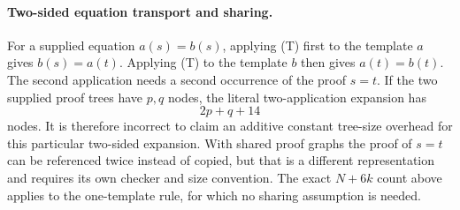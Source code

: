 \paragraph{Two-sided equation transport and sharing.}
For a supplied equation \(a(s)=b(s)\), applying (T) first to the template
\(a\) gives \(b(s)=a(t)\).  Applying (T) to the template \(b\) then gives
\(a(t)=b(t)\).  The second application needs a second occurrence of the
proof \(s=t\).  If the two supplied proof trees have \(p,q\) nodes, the
literal two-application expansion has
\[
                         2p+q+14
\]
nodes.  It is therefore incorrect to claim an additive constant
tree-size overhead for this particular two-sided expansion.  With
shared proof graphs the proof of \(s=t\) can be referenced twice
instead of copied, but that is a different representation and requires
its own checker and size convention.  The exact \(N+6k\) count above
applies to the one-template rule, for which no sharing assumption is
needed.


